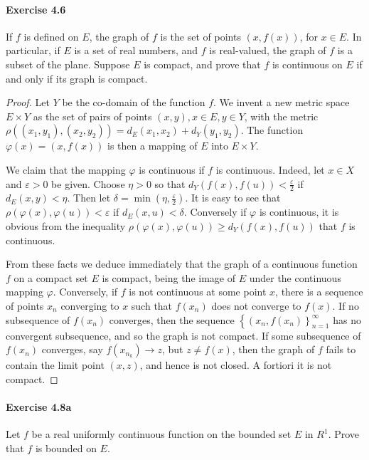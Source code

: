 \documentclass{article}
\theoremstyle{definition}
\begin{document}
\paragraph{Exercise 4.6} If $f$ is defined on $E$, the graph of $f$ is the set of points $(x, f(x))$, for $x \in E$. In particular, if $E$ is a set of real numbers, and $f$ is real-valued, the graph of $f$ is a subset of the plane. Suppose $E$ is compact, and prove that $f$ is continuous on $E$ if and only if its graph is compact.
\begin{proof}
    Let $Y$ be the co-domain of the function $f$. We invent a new metric space $E \times Y$ as the set of pairs of points $(x, y), x \in E, y \in Y$, with the metric $\rho\left(\left(x_1, y_1\right),\left(x_2, y_2\right)\right)=d_E\left(x_1, x_2\right)+d_Y\left(y_1, y_2\right)$. The function $\varphi(x)=(x, f(x))$ is then a mapping of $E$ into $E \times Y$.

We claim that the mapping $\varphi$ is continuous if $f$ is continuous. Indeed, let $x \in X$ and $\varepsilon>0$ be given. Choose $\eta>0$ so that $d_Y(f(x), f(u))<\frac{\varepsilon}{2}$ if $d_E(x, y)<\eta$. Then let $\delta=\min \left(\eta, \frac{\varepsilon}{2}\right)$. It is easy to see that $\rho(\varphi(x), \varphi(u))<\varepsilon$ if $d_E(x, u)<\delta$. Conversely if $\varphi$ is continuous, it is obvious from the inequality $\rho(\varphi(x), \varphi(u)) \geq d_Y(f(x), f(u))$ that $f$ is continuous.

From these facts we deduce immediately that the graph of a continuous function $f$ on a compact set $E$ is compact, being the image of $E$ under the continuous mapping $\varphi$. Conversely, if $f$ is not continuous at some point $x$, there is a sequence of points $x_n$ converging to $x$ such that $f\left(x_n\right)$ does not converge to $f(x)$. If no subsequence of $f\left(x_n\right)$ converges, then the sequence $\left\{\left(x_n, f\left(x_n\right)\right\}_{n=1}^{\infty}\right.$ has no convergent subsequence, and so the graph is not compact. If some subsequence of $f\left(x_n\right)$ converges, say $f\left(x_{n_k}\right) \rightarrow z$, but $z \neq f(x)$, then the graph of $f$ fails to contain the limit point $(x, z)$, and hence is not closed. A fortiori it is not compact.
\end{proof}


\paragraph{Exercise 4.8a} Let $f$ be a real uniformly continuous function on the bounded set $E$ in $R^{1}$. Prove that $f$ is bounded on $E$.
\end{document}
